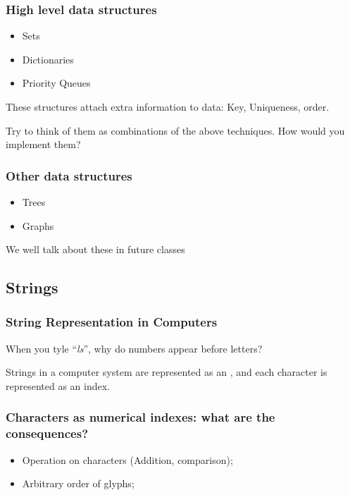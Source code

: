 \documentclass{beamer}
\begin{document}
\begin{frame}
  \frametitle{High level data structures}
  \begin{itemize}
  \item Sets
  \item Dictionaries
  \item Priority Queues
  \end{itemize}
  
  \bigskip

  \begin{block}{}
    These structures attach extra information to data: Key,
    Uniqueness, order.
    \medskip

    Try to think of them as combinations of the above techniques. How
    would you implement them?
  \end{block}
\end{frame}

\begin{frame}
  \frametitle{Other data structures}
  \begin{itemize}
  \item Trees
  \item Graphs
  \end{itemize}

  \bigskip

  We well talk about these in future classes
\end{frame}

\subsection{Strings}

\begin{frame}
  \frametitle{String Representation in Computers} 
  When you tyle ``\emph{ls}'', why do numbers appear before letters?

  \bigskip
  
  \begin{block}{}
    Strings in a computer system are represented as an
    , and each character is represented
    as an index.
  \end{block}
\end{frame}

\begin{frame}
  \frametitle{Characters as numerical indexes: what are the consequences?}
  \begin{itemize}
  \item Operation on characters (Addition, comparison);
  \item Arbitrary order of glyphs;
  \end{itemize}
\end{frame}
\end{document}
